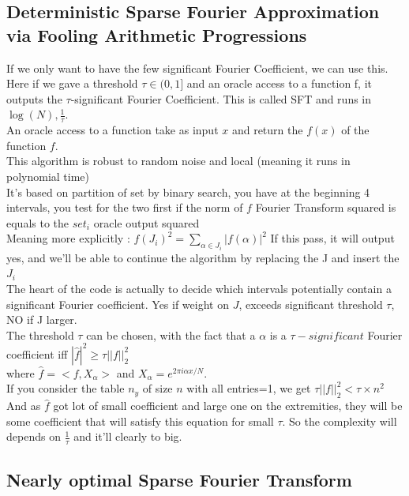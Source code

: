 \documentclass{article}
\begin{document}
\subsection{Deterministic Sparse Fourier Approximation via Fooling Arithmetic Progressions}

If we only want to have the few significant Fourier Coefficient, we can use this.\\
Here if we gave a threshold $\tau \in (0,1]$ and an oracle access to a function f, it outputs the $\tau$-significant Fourier Coefficient. This is called SFT and runs in $\log(N),\frac{1}{\tau}$.\\
An oracle access to a function take as input $x$ and return the $f(x)$ of the function $f$.\\
This algorithm is robust to random noise and local (meaning it runs in polynomial time)\\
It's based on partition of set by binary search, you have at the beginning 4 intervals, you test for the two first if the norm of $f$ Fourier Transform squared is equals to the $set_i$ oracle output squared\\
Meaning more explicitly : $f(J_i)^2 = \sum_{\alpha \in J_i}{|f(\alpha)|^2}$ If this pass, it will output yes, and we'll be able to continue the algorithm by replacing the J and insert the $J_i$\\
The heart of the code is actually to decide which intervals potentially contain a significant Fourier coefficient. Yes if weight on $J$, exceeds significant threshold $\tau$, NO if J larger.\\
The threshold $\tau$ can be chosen, with the fact that a $\alpha$ is a $\tau -significant$ Fourier coefficient iff $|\hat{f}|^2 \geq \tau||f||^{2}_2$\\ where $\hat{f} = <f,X_{\alpha}>$ and $X_{\alpha} = e^{2\pi i \alpha x/N}$.\\
If you consider the table $n_y$ of size $n$ with all entries=1, we get $\tau||f||^{2}_2 < \tau \times n^2$\\
And as $\hat{f}$ got lot of small coefficient and large one on the extremities, they will be some coefficient that will satisfy this equation for small $\tau$. So the complexity will depends on $\frac{1}{\tau}$ and it'll clearly to big.

\subsection{Nearly optimal Sparse Fourier Transform}
\end{document}
